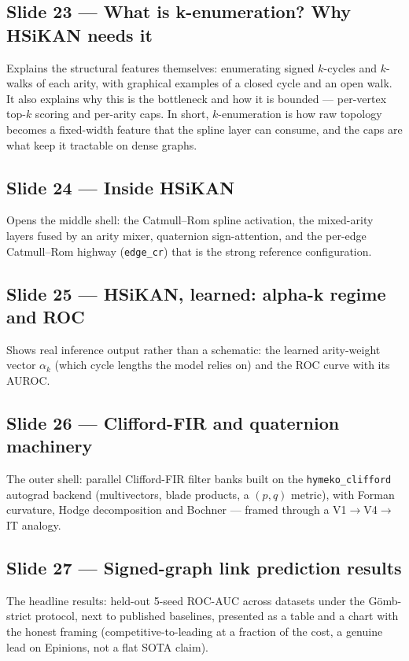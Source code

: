 \documentclass[10pt]{article}
\begin{document}
\subsection*{Slide 23 --- What is k-enumeration? Why HSiKAN needs it}
Explains the structural features themselves: enumerating signed $k$-cycles and $k$-walks of each arity, with graphical examples of a closed cycle and an open walk. It also explains why this is the bottleneck and how it is bounded --- per-vertex top-$k$ scoring and per-arity caps. In short, $k$-enumeration is how raw topology becomes a fixed-width feature that the spline layer can consume, and the caps are what keep it tractable on dense graphs.

\subsection*{Slide 24 --- Inside HSiKAN}
Opens the middle shell: the Catmull--Rom spline activation, the mixed-arity layers fused by an arity mixer, quaternion sign-attention, and the per-edge Catmull--Rom highway (\texttt{edge\_cr}) that is the strong reference configuration.

\subsection*{Slide 25 --- HSiKAN, learned: alpha-k regime and ROC}
Shows real inference output rather than a schematic: the learned arity-weight vector $\alpha_k$ (which cycle lengths the model relies on) and the ROC curve with its AUROC.

\subsection*{Slide 26 --- Clifford-FIR and quaternion machinery}
The outer shell: parallel Clifford-FIR filter banks built on the \texttt{hymeko\_clifford} autograd backend (multivectors, blade products, a $(p,q)$ metric), with Forman curvature, Hodge decomposition and Bochner --- framed through a V1$\to$V4$\to$IT analogy.

\subsection*{Slide 27 --- Signed-graph link prediction results}
The headline results: held-out 5-seed ROC-AUC across datasets under the G\"omb-strict protocol, next to published baselines, presented as a table and a chart with the honest framing (competitive-to-leading at a fraction of the cost, a genuine lead on Epinions, not a flat SOTA claim).
\end{document}
